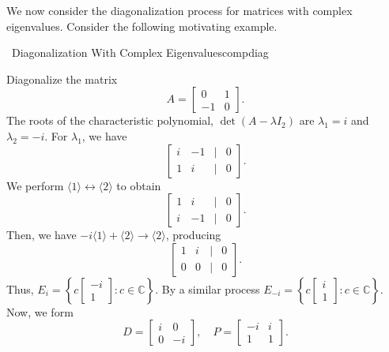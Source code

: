         We now consider the diagonalization process for matrices with complex eigenvalues. Consider the following motivating example.
        \begin{example}{\Difficulty\,\Difficulty\,\,Diagonalization With Complex Eigenvalues}{compdiag}

            Diagonalize the matrix
            \begin{equation*}
                A=\begin{bmatrix}
                    0 & 1 \\
                     -1 & 0
                \end{bmatrix}.
            \end{equation*}
            The roots of the characteristic polynomial, \(\det(A-\lambda I_2)\) are \(\lambda_1=i\) and \(\lambda_2=-i\). For \(\lambda_1\), we have
            \begin{equation*}
                \begin{bmatrix}
                    i & -1 & | & 0 \\
                    1 & i & | & 0
                \end{bmatrix}.
            \end{equation*}
            We perform \(\langle1\rangle\leftrightarrow\langle2\rangle\) to obtain
            \begin{equation*}
                \begin{bmatrix}
                    1 & i & | & 0 \\
                    i & -1 & | & 0
                \end{bmatrix}.
            \end{equation*}
            Then, we have \(-i\langle1\rangle+\langle2\rangle\to\langle2\rangle\), producing
            \begin{equation*}
                \begin{bmatrix}
                    1 & i & | & 0 \\
                    0 & 0 & | & 0
                \end{bmatrix}.
            \end{equation*}
            Thus, \(E_i=\left\{c\begin{bmatrix} -i \\ 1 \end{bmatrix}:c\in\mathbb{C}\right\}\). By a similar process \(E_{-i}=\left\{c\begin{bmatrix} i \\ 1\end{bmatrix}:c\in\mathbb{C}\right\}\). Now, we form
            \begin{equation*}
                D=\begin{bmatrix}
                    i & 0 \\
                    0 & -i
                \end{bmatrix},\quad
                P=\begin{bmatrix}
                    -i & i \\
                    1 & 1
                \end{bmatrix}.
            \end{equation*}
            

\end{example}
